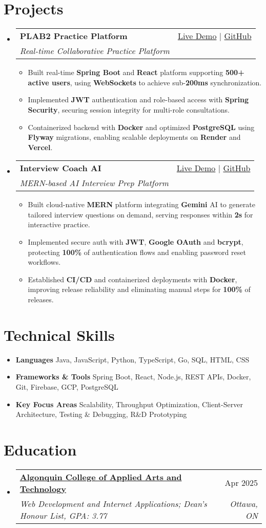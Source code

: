 \documentclass[letterpaper,11pt]{article}
\makeatletter
\newcommand{\resumeItem}[1]{\item\small{#1 \vspace{-2pt}}}
\newcommand{\resumeSubheading}[4]{
  \vspace{-1pt}\item
    \begin{tabular*}{0.97\textwidth}[t]{l@{\extracolsep{\fill}}r}
      \textbf{#1} & #2 \\
      \textit{\small#3} & \textit{\small #4} \\
    \end{tabular*}\vspace{-5pt}
}
\newcommand{\resumeSubHeadingListStart}{\begin{itemize}[leftmargin=*]}
\newcommand{\resumeSubHeadingListEnd}{\end{itemize}}
\newcommand{\resumeItemListStart}{\begin{itemize}}
\newcommand{\resumeItemListEnd}{\end{itemize}\vspace{-5pt}}
\makeatother
\begin{document}
\section{Projects}
  \resumeSubHeadingListStart
    \resumeSubheading
      {\textbf{PLAB2 Practice Platform}}{\href{https://plab2practice.com}{Live Demo} | \href{https://github.com/altansaid/plab2projectnew}{GitHub}}
      {Real-time Collaborative Practice Platform}{}
      \resumeItemListStart
        \resumeItem{Built real-time \textbf{Spring Boot} and \textbf{React} platform supporting \textbf{500+ active users}, using \textbf{WebSockets} to achieve sub-\textbf{200ms} synchronization.}
        \resumeItem{Implemented \textbf{JWT} authentication and role-based access with \textbf{Spring Security}, securing session integrity for multi-role consultations.}
        \resumeItem{Containerized backend with \textbf{Docker} and optimized \textbf{PostgreSQL} using \textbf{Flyway} migrations, enabling scalable deployments on \textbf{Render} and \textbf{Vercel}.}
      \resumeItemListEnd

    \resumeSubheading
      {\textbf{Interview Coach AI}}{\href{https://interviewcoach-ai.vercel.app/}{Live Demo} | \href{https://github.com/altansaid/interviewcoach-ai}{GitHub}}
      {MERN-based AI Interview Prep Platform}{}
      \resumeItemListStart
    \resumeItem{Built cloud-native \textbf{MERN} platform integrating \textbf{Gemini} AI to generate tailored interview questions on demand, serving responses within \textbf{2s} for interactive practice.}
    \resumeItem{Implemented secure auth with \textbf{JWT}, \textbf{Google OAuth} and \textbf{bcrypt}, protecting \textbf{100\%} of authentication flows and enabling password reset workflows.}
    \resumeItem{Established \textbf{CI/CD} and containerized deployments with \textbf{Docker}, improving release reliability and eliminating manual steps for \textbf{100\%} of releases.}
      \resumeItemListEnd
  \resumeSubHeadingListEnd

\section{Technical Skills}
  \resumeItemListStart
    \resumeItem{\textbf{Languages}}{Java, JavaScript, Python, TypeScript, Go, SQL, HTML, CSS}
    \resumeItem{\textbf{Frameworks \& Tools}}{Spring Boot, React, Node.js, REST APIs, Docker, Git, Firebase, GCP, PostgreSQL}
    \resumeItem{\textbf{Key Focus Areas}}{Scalability, Throughput Optimization, Client-Server Architecture, Testing \& Debugging, R\&D Prototyping}
  \resumeItemListEnd

\section{Education}
  \resumeSubHeadingListStart
    \resumeSubheading
      {\href{https://www.algonquincollege.com/sat/program/web-development-internet-applications/}{Algonquin College of Applied Arts and Technology}}{Apr 2025}
      {Web Development and Internet Applications; Dean's Honour List, GPA: 3.77}{Ottawa, ON}
  \resumeSubHeadingListEnd
\end{document}
